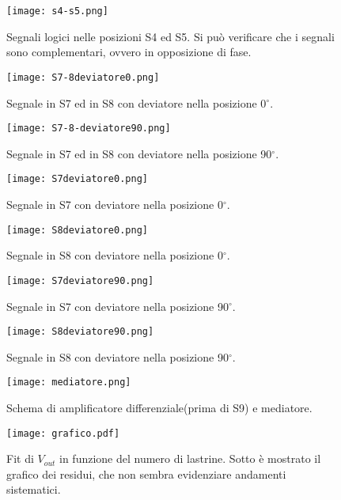 \begin{figure}[h]
	\centering
	\texttt{[image: s4-s5.png]}
	\caption{Segnali logici nelle posizioni S4 ed S5. Si può verificare che i segnali sono complementari, ovvero in opposizione di fase.}
	\label{f:s4-s5}
\end{figure}

\begin{figure}[h]
	\centering
	\texttt{[image: S7-8deviatore0.png]}
	\caption{Segnale in S7 ed in S8 con deviatore nella posizione 0$^\circ$.}
	\label{f:S7-8deviatore0}
\end{figure}

\begin{figure}[h]
	\centering
	\texttt{[image: S7-8-deviatore90.png]}
	\caption{Segnale in S7 ed in S8 con deviatore nella posizione 90$^\circ$.}
	\label{f:S7-8deviatore90}
\end{figure}

\begin{figure}[h]
	\centering
	\texttt{[image: S7deviatore0.png]}
	\caption{Segnale in S7 con deviatore nella posizione 0$^\circ$.}
	\label{f:S7deviatore0}
\end{figure}

\begin{figure}[h]
	\centering
	\texttt{[image: S8deviatore0.png]}
	\caption{Segnale in S8 con deviatore nella posizione 0$^\circ$.}
	\label{f:S8deviatore0}
\end{figure}

\begin{figure}[h]
	\centering
	\texttt{[image: S7deviatore90.png]}
	\caption{Segnale in S7 con deviatore nella posizione 90$^\circ$.}
	\label{f:S7deviatore90}
\end{figure}



\begin{figure}[h]
	\centering
	\texttt{[image: S8deviatore90.png]}
	\caption{Segnale in S8 con deviatore nella posizione 90$^\circ$.}
	\label{f:S8deviatore90}
\end{figure}

\begin{figure}[h]
	\centering
	\texttt{[image: mediatore.png]}
	\caption{Schema di amplificatore differenziale(prima di S9) e mediatore.}
	\label{f:Mediatore}
\end{figure}

\begin{figure}[h]
	\centering
	\texttt{[image: grafico.pdf]}
	\caption{Fit di $V_{out}$ in funzione del numero di lastrine. Sotto è mostrato il grafico dei residui, che non sembra evidenziare andamenti sistematici.}
	\label{f:Grafico}
\end{figure}